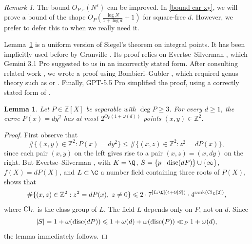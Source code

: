 \documentclass[reqno, 12pt]{amsart}
\theoremstyle{plain}
\newtheorem{lemma}[theorem]{Lemma}
\theoremstyle{definition}
\theoremstyle{remark}
\newtheorem*{remark}{Remark}
\renewcommand{\le}{\leqslant}
\renewcommand{\ge}{\geqslant}
\begin{document}
\begin{remark}
The bound $O_{P,\varepsilon}(N^\varepsilon)$
can be improved.
In \eqref{bound car xy}, we will prove
a bound of the shape $O_P(\frac{\log N}{1+\log d} + 1)$ for square-free $d$.
However, we prefer to defer this to when we really need it.
\end{remark}

Lemma~\ref{siegel} is a uniform version of Siegel's theorem on integral points.
It has been implicitly used before by Granville \cite[proof of Corollary~2]{GranvilleABC}.
Its proof relies on Evertse--Silverman \cite[Theorem~1(b)]{ES86},
which Gemini 3.1 Pro suggested to us in an incorrectly stated form.
After consulting related work \cite{Alpoge,BombieriGubler},
we wrote a proof using
Bombieri--Gubler \cite[Theorem~5.3.5]{BombieriGubler},
which required
genus theory such as \cite[Theorem~1]{Lemmer} or \cite[\S4]{BhargavaPlus}.
Finally, GPT-5.5 Pro simplified the proof,
using a correctly stated form of \cite[Theorem~1(b)]{ES86}.

\begin{lemma}
\label{siegel}
Let $P\in \mathbb{Z}[X]$ be separable with $\deg{P} \ge 3$.
For every $d\ge 1$,
the curve $P(x) = dy^2$ has at most $2^{O_P(1+\omega(d))}$
points $(x,y)\in \mathbb{Z}^2$.
\end{lemma}

\begin{proof}
First observe that
\begin{equation*}
\#\{(x,y)\in \mathbb{Z}^2:
P(x) = dy^2\}
\le \#\{(x,z)\in \mathbb{Z}^2:
z^2 = dP(x)\},
\end{equation*}
since each pair $(x,y)$ on the left
gives rise to a pair $(x,z) = (x,dy)$ on the right.
But Evertse--Silverman \cite[Theorem~1(b)]{ES86},
with $K=\Q$,
$S = \{p\mid \textnormal{disc}(dP)\} \cup \{\infty\}$,
$f(X) = dP(X)$,
and $L\subset \C$ a number field containing three roots of $P(X)$,
shows that
\begin{equation*}
\#\{(x,z)\in \mathbb{Z}^2:
z^2 = dP(x),
\; z\ne 0\}
\le 2\cdot 7^{[L:\Q](4+9|S|)} \cdot 4^{\textnormal{rank}(\textnormal{Cl}_L[2])},
\end{equation*}
where $\textnormal{Cl}_L$ is the class group of $L$.
The field $L$ depends only on $P$, not on $d$.
Since
\begin{equation*}
|S| = 1 + \omega(\textnormal{disc}(dP))
\le 1 + \omega(d) + \omega(\textnormal{disc}(P))
\ll_P 1 + \omega(d),
\end{equation*}
the lemma immediately follows.
\end{proof}
\end{document}

